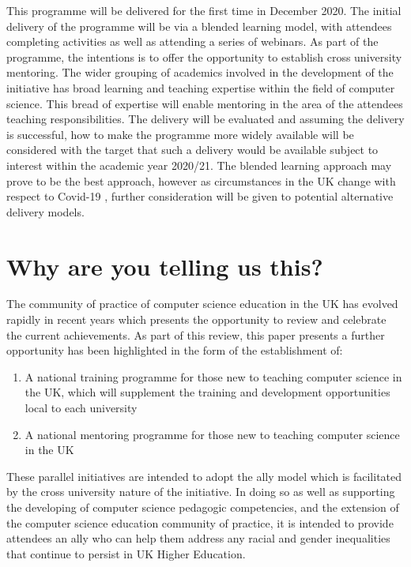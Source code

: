 \documentclass[sigconf]{acmart}
\begin{document}
This programme will be delivered for the first time in December 2020. The initial delivery of the programme will be via a blended learning model, with attendees completing activities as well as attending a series of webinars. As part of the programme, the intentions is to offer the opportunity to establish cross university mentoring. The wider grouping of academics involved in the development of the initiative has broad learning and teaching expertise within the field of computer science. This bread of expertise will enable mentoring in the area of the attendees teaching responsibilities. The delivery will be evaluated and assuming the delivery is successful, how to make the programme more widely available will be considered with the target that such a delivery would be available subject to interest within the academic year 2020/21. The blended learning approach may prove to be the best approach, however as circumstances in the UK change with respect to Covid-19 \cite{Crick20}, further consideration will be given to potential alternative delivery models.

\section{Why are you telling us this?}	
The community of practice of computer science education in the UK has evolved rapidly in recent years which presents the opportunity to  review and celebrate the current achievements. As part of this review, this paper presents a further opportunity has been highlighted in the form of the establishment of:
\begin{enumerate}
\item A national training programme for those new to teaching computer science in the UK, which will supplement the training and development opportunities local to each university
\item A national mentoring programme for those new to teaching computer science in the UK
\end{enumerate}
These parallel initiatives are intended to adopt the ally model which is facilitated by the cross university nature of the initiative. In doing so as well as supporting the developing of computer science pedagogic competencies, and  the extension of the computer science education community of practice, it is intended to provide attendees an ally who can help them address any racial and gender inequalities that continue to persist in UK Higher Education.
\end{document}
